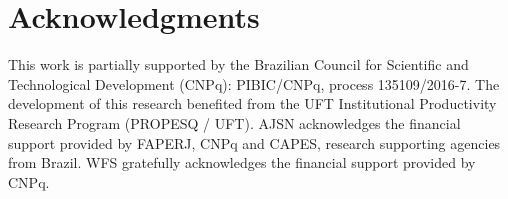 \section*{Acknowledgments}\label{sec:Acknowledgment}

This work is partially supported by the Brazilian Council for Scientific and Technological Development (CNPq): PIBIC/CNPq, process 135109/2016-7. The development of this research benefited from the UFT Institutional Productivity Research Program (PROPESQ / UFT). AJSN acknowledges the financial support provided by FAPERJ, CNPq and CAPES, research supporting agencies from Brazil. WFS gratefully acknowledges the financial support provided by CNPq.

	